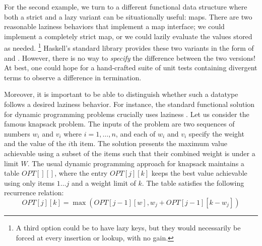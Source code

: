 \documentclass[acmsmall,review]{acmart}\settopmatter{}
\begin{document}
For the second example, we turn to a different functional data structure where
both a strict and a lazy variant can be situationally useful: maps. There are
two reasonable laziness behaviors that implement a map interface; we could
implement a completely strict map, or we could lazily evaluate the values stored
as needed.
\footnote{A third option could be to have lazy keys, but they would
necessarily be forced at every insertion or lookup, with no gain.}
Haskell's standard library provides these two variants in the form of
 and . However, there is no way
to {\em specify} the difference between the two versions! At best, one
could hope for a hand-crafted suite of unit tests containing divergent
terms to observe a difference in termination.


Moreover, it is important to be able to distinguish whether such a datatype
follows a desired laziness behavior. For instance, the standard functional
solution for dynamic programming problems crucially uses laziness . Let us consider the famous knapsack problem.
%
The inputs of the problem are two sequences of numbers $w_i$ and $v_i$
where $i = 1, \dots, n$, and each of $w_i$ and $v_i$ specify the
weight and the value of the $i$th item. The solution presents the
maximum value achievable using a subset of the items such that their
combined weight is under a limit $W$.
%
The usual dynamic programming approach for knapsack maintains a
table $OPT[][]$, where the entry $OPT[j][k]$ keeps the best value
achievable using only items $1\dots j$ and a weight limit of $k$. The
table satisfies the following recurrence relation: $$OPT[j][k]
= \max(OPT[j-1][w], w_j + OPT[j-1][k-w_j])$$
\end{document}
